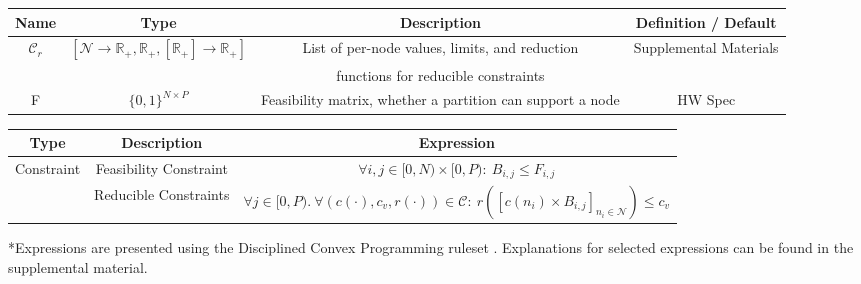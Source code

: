 \begin{table*}
	\begin{tabular}{c | c | c | c}
		\textbf{Name} & \textbf{Type} & \textbf{Description} & \textbf{Definition / Default}\\\hline
		$\mathcal{C}_r$& $[\mathcal{N} \to \mathbb{R}_+,\mathbb{R}_+, [\mathbb{R}_+] \to \mathbb{R}_+]$ & List of per-node values, limits, and reduction& Supplemental Materials\\&& functions for reducible constraints& \\
		F & $\{0, 1\}^{N \times P}$ & Feasibility matrix, whether a partition can support a node& HW Spec \\ 
	\end{tabular}
	\caption{ extension for solver-based merging, which is a generalization of the partitioning problem.}
	\label{tab:merging-variables}

	\begin{tabular}{c | c | c}
		\textbf{Type} & \textbf{Description} & \textbf{Expression}\\\hline
		Constraint & Feasibility Constraint & $ \forall i, j \in [0, N) \times [0, P):\ B_{i, j} \le F_{i, j}$\\
		& Reducible Constraints & $\forall j \in [0, P).\ \forall (c(\cdot), c_v, r(\cdot)) \in \mathcal{C}:\ r([c(n_i) \times B_{i, j}]_{n_i \in \mathcal{N}}) \le c_v$\\
	\end{tabular}
  \caption{ extension for solver-based merging*. The Retiming Partition objective is not used for merging.}
	\label{tab:merge-eqns}
  \scriptsize
  \raggedright
  \vspace{-0.3cm}
  *Expressions are presented using the Disciplined Convex Programming ruleset \cite{DCP, DCP-online}. Explanations for selected expressions can be found in the supplemental material.
\end{table*}

